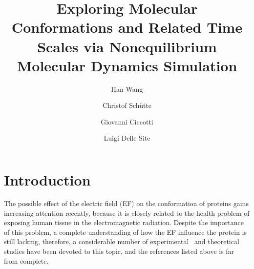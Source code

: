 \documentclass[a4paper,preprint,unsortedaddress,onecolumn]{revtex4-1}
\begin{document}
\title{Exploring Molecular Conformations and Related Time Scales via Nonequilibrium Molecular Dynamics Simulation}
\author{Han Wang}
\author{Christof Sch\"utte}
\author{Giovanni Ciccotti}
\author{Luigi Delle Site}

\begin{abstract}
\end{abstract}

\maketitle


\section{Introduction}


The possible effect of the electric field (EF) on the conformation of
proteins gains increasing attention recently, because it is closely
related to the health problem of exposing human tissue in the
electromagnetic radiation. Despite the importance of this problem, a
complete understanding of how the EF influence the  protein
is still lacking, therefore, a considerable number of
experimental~\cite{bohr2000microwave, bohr2000microwave-1,
  dePomerai2000cell, inskip2001cellular, mancinelli2004non} and
theoretical~\cite{budi2005electric, budi2007effect,
  budi2008comparative, toschi2008effects, astrakas2011electric,
  astrakas2012structural, damm2012can, starzyk2013proteins,
  english2009nonequilibrium, solomentsev2012effects} studies have been devoted to this topic,
and the references listed above is far from complete.
\end{document}
